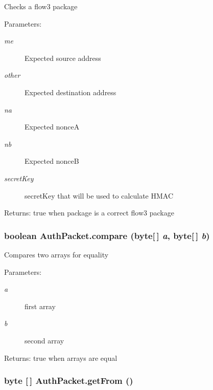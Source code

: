 Checks a flow3 package \begin{Desc}
\item[Parameters:]
\begin{description}
\item[{\em me}]Expected source address \item[{\em other}]Expected destination address \item[{\em na}]Expected nonce\-A \item[{\em nb}]Expected nonce\-B \item[{\em secret\-Key}]secret\-Key that will be used to calculate HMAC \end{description}
\end{Desc}
\begin{Desc}
\item[Returns:]true when package is a correct flow3 package \end{Desc}
\hypertarget{class_auth_packet_c11}{
\subsubsection[compare]{\setlength{\rightskip}{0pt plus 5cm}boolean Auth\-Packet.compare (byte\mbox{[}$\,$\mbox{]} {\em a}, byte\mbox{[}$\,$\mbox{]} {\em b})}}
\label{class_auth_packet_c11}


Compares two arrays for equality \begin{Desc}
\item[Parameters:]
\begin{description}
\item[{\em a}]first array \item[{\em b}]second array \end{description}
\end{Desc}
\begin{Desc}
\item[Returns:]true when arrays are equal \end{Desc}
\hypertarget{class_auth_packet_c3}{
\subsubsection[getFrom]{\setlength{\rightskip}{0pt plus 5cm}byte \mbox{[}$\,$\mbox{]} Auth\-Packet.get\-From ()}}
\label{class_auth_packet_c3}


